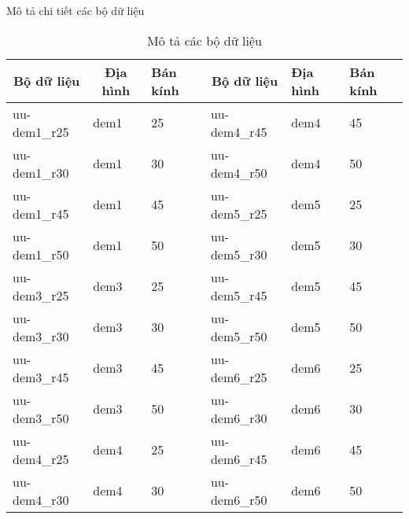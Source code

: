 Mô tả chi tiết các bộ dữ liệu 
\begin{table}[H]
    \begin{tabularx}{\linewidth}{|X |l |l|X |l |l|}
    \hline
    \multicolumn{1}{|c|}{Bộ dữ liệu} & \multicolumn{1}{c|}{Địa hình} & Bán kính & \multicolumn{1}{c|}{Bộ dữ liệu} & Địa hình & Bán kính \\ \hline
    uu-dem1\_r25                                          & dem1                                                  & 25       & uu-dem4\_r45                                         & dem4     & 45       \\ \hline
    uu-dem1\_r30                                          & dem1                                                  & 30       & uu-dem4\_r50                                         & dem4     & 50       \\ \hline
    uu-dem1\_r45                                          & dem1                                                  & 45       & uu-dem5\_r25                                         & dem5     & 25       \\ \hline
    uu-dem1\_r50                                          & dem1                                                  & 50       & uu-dem5\_r30                                         & dem5     & 30       \\ \hline
    uu-dem3\_r25                                          & dem3                                                  & 25       & uu-dem5\_r45                                         & dem5     & 45       \\ \hline
    uu-dem3\_r30                                          & dem3                                                  & 30       & uu-dem5\_r50                                         & dem5     & 50       \\ \hline
    uu-dem3\_r45                                          & dem3                                                  & 45       & uu-dem6\_r25                                         & dem6     & 25       \\ \hline
    uu-dem3\_r50                                          & dem3                                                  & 50       & uu-dem6\_r30                                         & dem6     & 30       \\ \hline
    uu-dem4\_r25                                          & dem4                                                  & 25       & uu-dem6\_r45                                         & dem6     & 45       \\ \hline
    uu-dem4\_r30                                          & dem4                                                  & 30       & uu-dem6\_r50                                         & dem6     & 50       \\ \hline
    \end{tabularx}
    \caption{Mô tả các bộ dữ liệu}
\end{table}



